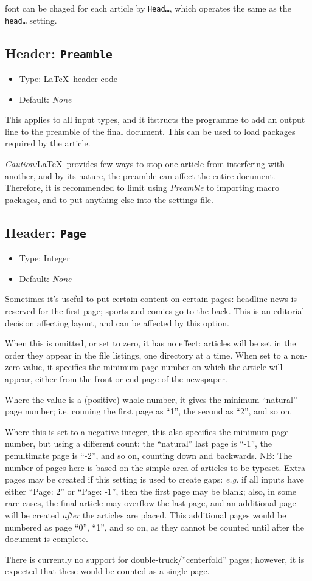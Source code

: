 \documentclass[a4paper,DIV=11]{scrartcl}
\newcommand{\property}[5]{
  \subsection{#1: \texttt{#2}}
  \begin{itemize}
  \item Type: #3
  \item Default: #4
  \end{itemize}
  #5
}
\newcommand{\header}{\property{Header}}
\begin{document}
\begin{multicols}{2}
{  font can be chaged for each article by \texttt{Head\dots}, which
  operates the same as the \texttt{head\dots} setting.
}
\header{Preamble}{\LaTeX\ header code}{\textit{None}}{
  This applies to all input types, and it itstructs the programme to
  add an output line to the preamble of the final document. This
  can be used to load packages required by the article.\par
  \textit{Caution:}\LaTeX\ provides few ways to stop one article from
  interfering with another, and by its nature, the preamble can affect
  the entire document. Therefore, it is recommended to limit using
  \textit{Preamble} to importing macro packages, and to put anything
  else into the settings file.
}
\header{Page}{Integer}{\textit{None}}{
  Sometimes it's useful to put certain content on certain pages:
  headline news is reserved for the first page; sports and comics go
  to the back. This is an editorial decision affecting layout, and can
  be affected by this option.
  
  When this is omitted, or set to zero, it has no effect: articles
  will be set in the order they appear in the file listings, one
  directory at a time. When set to a non-zero value, it specifies the
  minimum page number on which the article will appear, either from
  the front or end page of the newspaper.
  
  Where the value is a (positive) whole number, it gives the minimum
  ``natural'' page number; i.e. couning the first page
  as ``1'', the second as ``2'', and so on.

  Where this is set to a negative integer, this also specifies the
  minimum page number, but using a different count: the ``natural''
  last page is ``-1'', the penultimate page is ``-2'', and so on,
  counting down and backwards. NB: The number of pages here is based
  on the simple area of articles to be typeset. Extra pages may be
  created if this setting is used to create gaps: \textit{e.g.} if all inputs
  have either ``Page: 2'' or ``Page: -1'', then the first page may be
  blank; also, in some rare cases, the final article may overflow the
  last page, and an additional page will be created \textit{after} the
  articles are placed. This additional pages would be numbered as page
  ``0'', ``1'', and so on, as they cannot be counted until after the
  document is complete.

  There is currently no support for double-truck/''centerfold'' pages;
  however, it is expected that these would be counted as a single
  page.

}
\end{multicols}
\end{document}
